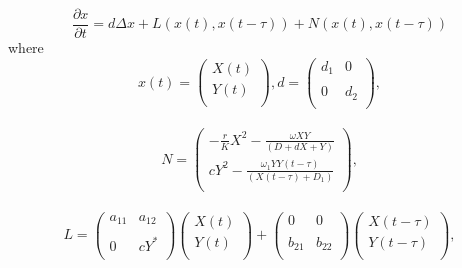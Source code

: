 \documentclass[10pt]{amsart}
\theoremstyle{definition}
\begin{document}
\begin{equation}\label{eq:3.2}
\frac{\partial x}{\partial t}=d \Delta x + L(x(t),x(t-\tau))+N(x(t),x(t-\tau))
\end{equation}
where
$$x(t)=\left(
            \begin{array}{c}
             {\displaystyle{X(t)}}\\
             {\displaystyle{Y(t)}}\\
            \end{array}
     \right),
		d=\left(
            \begin{array}{cc}
             {\displaystyle{d_1}} & {\displaystyle{0}}\\ \\
             {\displaystyle{0}} & {\displaystyle{d_2}}\\
            \end{array}
     \right),$$
		\\
		$$N=\left(
            \begin{array}{c}
             {\displaystyle{-\frac{r}{K}X^2-\frac{\omega XY}{(D+dX+Y)}}}\\
             {\displaystyle{cY^2-\frac{ \omega_1 YY(t-\tau)}{(X(t-\tau)+D_1)}}}\\
            \end{array}
						\right),$$
\\
$$L=\left(
      \begin{array}{cc}
      {\displaystyle{a_{11}}} & {\displaystyle{a_{12}}} \\ \\
      {\displaystyle{0}} & {\displaystyle{cY^*}} \\
    \end{array}
    \right)
					\left(
         \begin{array}{c}
         {\displaystyle{X(t)}}\\
         {\displaystyle{Y(t)}}\\
         \end{array}
		     \right)
		   + \left(
       \begin{array}{cc}
       {\displaystyle{0}} & {\displaystyle{0}}\\ \\
     {\displaystyle{b_{21}}} & {\displaystyle{b_{22}}}\\
    \end{array}
    \right)
				\left(
            \begin{array}{c}
             {\displaystyle{X(t-\tau)}}\\
             {\displaystyle{Y(t-\tau)}}\\
            \end{array}
     \right),$$
\end{document}
